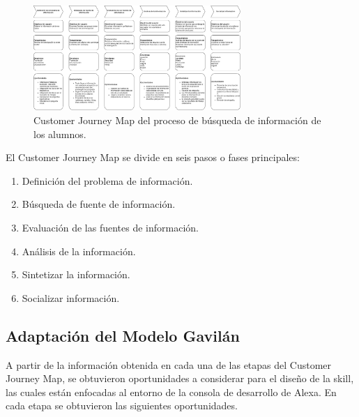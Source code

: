 \begin{figure}
  \centering
  \includegraphics[width=0.70\textwidth]{Cap4/Figuras/Customer Journey Map Skill.jpg}
  \caption{Customer Journey Map del proceso de búsqueda de información de los alumnos.}
  \label{fig:415}
\end{figure}

El Customer Journey Map se divide en seis pasos o fases principales:

\begin{enumerate}
  \item Definición del problema de información.
  \item Búsqueda de fuente de información.
  \item Evaluación de las fuentes de información.
  \item Análisis de la información.
  \item Sintetizar la información.
  \item Socializar información.
\end{enumerate}


\subsection{Adaptación del Modelo Gavilán}
\label{AdaptacionModeloGavilancapIV}

A partir de la información obtenida en cada una de las etapas del Customer Journey Map, se obtuvieron oportunidades a considerar para el diseño de la skill, las cuales están enfocadas al entorno de la consola de desarrollo de Alexa. En cada etapa se obtuvieron las siguientes oportunidades.

